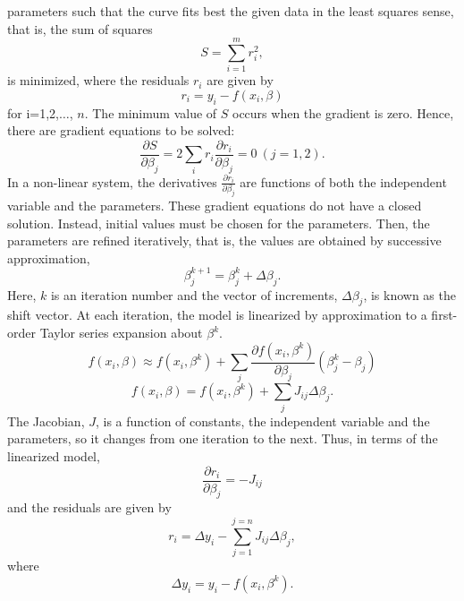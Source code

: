 \documentclass[journal]{IEEEtran}
\begin{document}
parameters such that the curve fits best the given data in the least
squares sense, that is, the sum of squares
\begin{equation}
    S=\sum_{i=1}^{m}r_i^2 ,
\end{equation}
is minimized, where the residuals $r_i$ are given by
\begin{equation}
    r_i = y_i - f(x_i,\beta)
\end{equation}
for i=1,2,$\dots$, $n$.
\newline
The minimum value of $S$ occurs when the gradient is zero. Hence, there are gradient equations to be solved:
\begin{equation}
    \frac{\partial S}{\partial \beta_j}=2\sum_i r_i\frac{\partial r_i}{\partial \beta_j}=0 \ (j=1,2).
\end{equation}
In a non-linear system, the derivatives $\frac{\partial
r_i}{\partial \beta_j}$ are functions of both the independent
variable and the parameters. These gradient equations do not have a
closed solution. Instead, initial values must be chosen for the
parameters. Then, the parameters are refined iteratively, that is,
the values are obtained by successive approximation,
\begin{equation}
    \beta_j^{k+1}=\beta^k_j+\Delta \beta_j.
\end{equation}
Here, $k$ is an iteration number and the vector of increments,
$\Delta \beta_j$, is known as the shift vector. At each iteration,
the model is linearized by approximation to a first-order Taylor
series expansion about $\beta^k$.
\begin{equation}
    f(x_i,\beta)\approx f(x_i,\beta^k) +\sum_j \frac{\partial f(x_i, \beta^k)}{\partial \beta_j} \left(\beta^k_j -\beta_j \right)
\end{equation}
\begin{equation}
 f(x_i,\beta) =f(x_i, \beta^k)+\sum_j J_{ij} \Delta\beta_j.
\end{equation}
The Jacobian, $J$, is a function of constants, the independent
variable and the parameters, so it changes from one iteration to the
next. Thus, in terms of the linearized model,
\begin{equation}
\frac{\partial r_i}{\partial \beta_j}=-J_{ij}
\end{equation}
and the residuals are given by
\begin{equation}
    r_i=\Delta y_i- \sum_{j=1}^{j=n} J_{ij}\Delta\beta_j,
\end{equation}
where
\begin{equation}
 \Delta y_i=y_i- f(x_i, \beta^k).
\end{equation}
\end{document}
